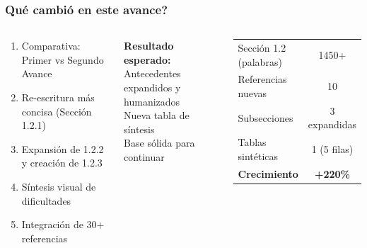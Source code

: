 \documentclass[11pt, aspectratio=169, spanish]{beamer}
\newcommand{\semOK}{\textcolor{VerdeOk}{\faCheckCircle}}
\begin{document}
\begin{frame}[plain]
\frametitle{\faClipboardList\quad \textquestiondown{}Qué cambió en este avance?}
\vspace{0.1cm}

\begin{columns}[T]

\begin{tcolorbox}[colback=VerdeUNAL!8, colframe=VerdeUNAL!70, arc=2mm,
  title={\footnotesize\textbf{En esta sesión veremos}}]
\footnotesize
\begin{enumerate}[leftmargin=*, label=\textcolor{VerdeUNAL}{\textbf{\arabic*.}}, itemsep=3pt]
  \item \faCompressAlt\quad Comparativa: Primer vs Segundo Avance
  \item \faPencilAlt\quad Re-escritura más concisa (Sección 1.2.1)
  \item \faPlus\quad Expansión de 1.2.2 y creación de 1.2.3
  \item \faTable\quad Síntesis visual de dificultades
  \item \faBook\quad Integración de 30+ referencias
\end{enumerate}
\end{tcolorbox}

\vspace{0.18cm}

\begin{tcolorbox}[colback=GrisFondo, colframe=GrisClaro, arc=2mm]
{\footnotesize\textbf{Resultado esperado:}\\[0.05cm]
\semOK\; {\small Antecedentes expandidos y humanizados}\\
\semOK\; {\small Nueva tabla de síntesis}\\
\semOK\; {\small Base sólida para continuar}}
\end{tcolorbox}


\begin{tcolorbox}[colback=GrisFondo, colframe=GrisClaro, arc=2mm,
  title={\footnotesize\textbf{\faChartPie\quad Datos del segundo avance}}]
\vspace{0.1cm}
\begin{center}
\begin{tabular}{lc}
\scriptsize Sección 1.2 (palabras) & \scriptsize 1450+ \\[4pt]
\scriptsize Referencias nuevas & \scriptsize 10 \\[4pt]
\scriptsize Subsecciones & \scriptsize 3 expandidas \\[4pt]
\scriptsize Tablas sintéticas & \scriptsize 1 (5 filas) \\[4pt]
\scriptsize\textbf{Crecimiento} & \scriptsize\textbf{\textcolor{VerdeOk}{+220\%}} \\
\end{tabular}


\end{center}
\end{tcolorbox}
\end{columns}
\end{frame}
\end{document}
